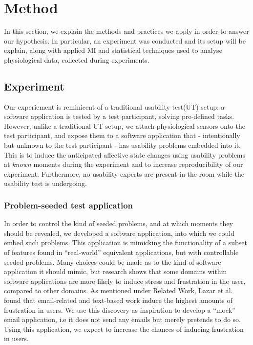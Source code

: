 \section{Method}
In this section, we explain the methods and practices we apply in order to answer our hypothesis. In particular, an
experiment was conducted and its setup will be explain, along with applied MI and statistical techniques used to analyse
physiological data, collected during experiments.

\subsection{Experiment}
Our experiement is reminicent of a traditional usability test(UT) setup: a software application is tested by a test
participant, solving pre-defined tasks. However, unlike a traditional UT setup, we attach physiological sensors
onto the test participant, and expose them to a software application that - intentionally but unknown to the test
participant - has usability problems embedded into it. This is to induce the anticipated affective state changes using
usability problems at \textit{known} moments during the experiment and to increase reproducibility of our
experiment. Furthermore, no usability experts are present in the room while the usability test is undergoing.

\subsubsection{Problem-seeded test application}
In order to control the kind of seeded problems, and at which moments they should be revealed, we developed a software
application, into which we could embed such problems. This application is mimicking the functionality of a subset of
features found in ``real-world'' equivalent applications, but with controllable seeded problems.  Many choices could be
made as to the kind of software application it should mimic, but research shows that some domains within software
applications are more likely to induce stress and frustration in the user, compared to other domains.  As mentioned
under Related Work, Lazar et al.~\cite{frustration_with_computers} found that email-related and text-based work induce
the highest amounts of frustration in users. We use this discovery as inspiration to develop a ``mock'' email
application, i.e it does not send any emails but merely pretends to do so. Using this application, we expect to increase
the chances of inducing frustration in users.

